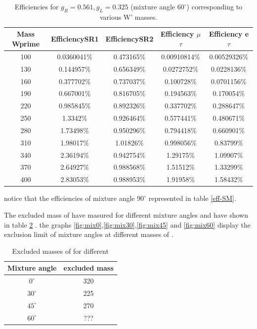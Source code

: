  \begin{table}[htb]
 	\centering
  	\begin{tabular}{|ccccc|}
  		\hline 
  		Mass Wprime & EfficiencySR1 & EfficiencySR2 & Efficiency $\mu$$\tau$ & Efficiency e $\tau$ \\
\hline 
  		100&0.0360041\%&0.473165\%&0.00910814\%&0.00529326\%\\
        	130& 0.144957\%& 0.656349\%&0.0272752\%& 0.0228136\%\\
        	160&0.377702\%&0.737037\%&0.100728\%&0.0701156\%\\
          	190& 0.667001\%& 0.816705\%& 0.194563\%& 0.170054\%\\
                220&0.985845\%&0.892326\%&0.337702\%&0.288647\%\\
                250&1.3342\%&0.926464\%&0.577441\%&0.480671\%\\ 
          	280& 1.73498\%& 0.950296\%& 0.794418\%& 0.660901\%\\
                310&1.98017\%&1.01826\%&0.998056\%&0.83799\%\\
                340& 2.36194\%& 0.942754\%& 1.29175\%& 1.09907\%\\ 
                370& 2.64927\%& 0.988568\%& 1.51512\%& 1.33299\%\\
        	400&2.83053\%&0.988953\%&1.91958\%&1.58432\%\\

  		\hline
  	\end{tabular}
  	\caption{Efficiencies for  $ g_R=0.561 , g_L=0.325$  (mixture angle $60^\circ$) corresponding to various W' masses. \label{eff-mix60} }
  \end{table}

notice that the efficiencies of mixture angle $90^\circ$ represented in table \ref{eff-SM}. 


  The excluded mass of \wprime have masured for different mixture angles and have shown in table \ref{tab:ex mass} . the graphs \ref{fig:mix0},\ref{fig:mix30},\ref{fig:mix45} and \ref{fig:mix60} display the exclusion limit of mixture angles at different masses of \wprime. 

\begin{table}[htb]
	\centering
	\begin{tabular}{|c|c|}
		\hline 
		\wprime Mixture angle & excluded mass \\
		\hline 
		$0^\circ$ & 320\\
		$30^\circ$ & 225\\
		$45^\circ$ & 270\\
		$60^\circ$& ???\\
		\hline
	\end{tabular}
	\caption{Excluded masses of \wprime for different \wprime \label{tab:ex mass} }
\end{table}

